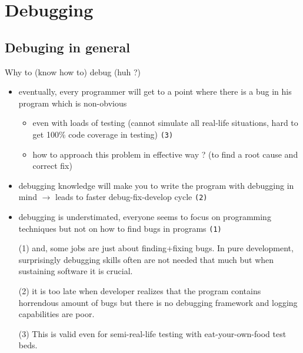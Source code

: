 
\section{Debugging}

\subsection{Debuging in general}

Why to (know how to) debug (huh ?)
\begin{itemize}
  \item eventually, every programmer will get to a point where there is
    a bug in his program which is non-obvious
    \begin{itemize}
    \item even with loads of testing (cannot simulate all real-life situations,
      hard to get 100\% code coverage in testing) \texttt{(3)}
    \item how to approach this problem in effective way ? (to find a root cause
      and correct fix)
    \end{itemize}
  \item debugging knowledge will make you to write the program with debugging
    in mind $\rightarrow$ leads to faster debug-fix-develop cycle \texttt{(2)}
  \item debugging is understimated, everyone seems to focus on programming
    techniques but not on how to find bugs in programs \texttt{(1)}
\end{itemize}

\begin{itemize}
  \item[(1)] and, some jobs are just about finding+fixing bugs.
  In pure development, surprisingly debugging skills
  often are not needed that much but when sustaining software it is crucial.
  \item[(2)] it is too late when developer realizes that the program contains
      horrendous amount of bugs but there is no debugging framework
      and logging capabilities are poor.
  \item[(3)] This is valid even for semi-real-life testing with
      eat-your-own-food test beds.
\end{itemize}

